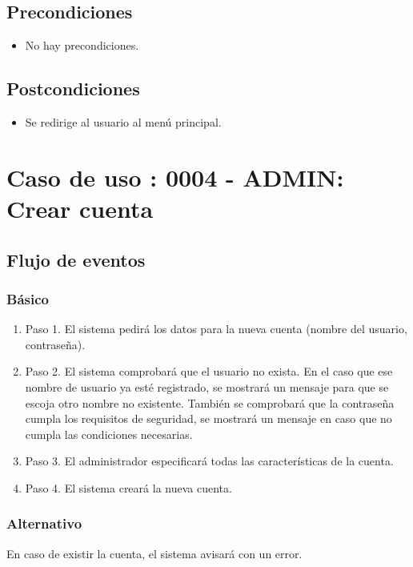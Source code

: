 \subsection{Precondiciones}
\begin{itemize}
\item No hay precondiciones.
\end{itemize}

\subsection{Postcondiciones}
\begin{itemize}
\item Se redirige al usuario al menú principal.
\end{itemize}



\section{Caso de uso : 0004 - ADMIN: Crear cuenta}\label{sec:uc0}
\subsection{Flujo de eventos}
\subsubsection{Básico}

\begin{enumerate}
\item Paso 1.
El sistema pedirá los datos para la nueva cuenta (nombre del usuario, contraseña).
\item Paso 2.
El sistema comprobará que el usuario no exista. En el caso que ese nombre de usuario ya esté registrado, se mostrará un mensaje para que se escoja otro nombre no existente. También se comprobará que la contraseña cumpla los requisitos de seguridad, se mostrará un mensaje en caso que no cumpla las condiciones necesarias.
\item Paso 3.
El administrador especificará todas las características de la cuenta.
\item Paso 4.
El sistema creará la nueva cuenta.
\end{enumerate}

\subsubsection{Alternativo}
En caso de existir la cuenta, el sistema avisará con un error.

